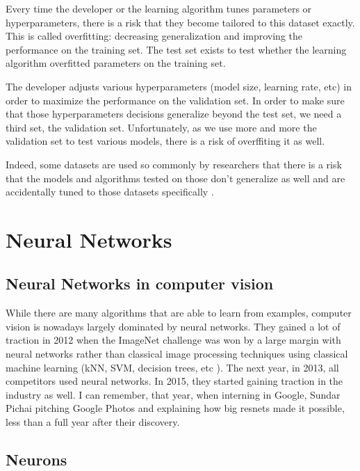Every time the developer or the learning algorithm tunes parameters or hyperparameters, there is a risk that they become tailored to this dataset exactly. This is called overfitting: decreasing generalization and improving the performance on the training set. The test set exists to test whether the learning algorithm overfitted parameters on the training set.

The developer adjusts various hyperparameters (model size, learning rate, etc) in order to maximize the performance on the validation set. In order to make sure that those hyperparameters decisions generalize beyond the test set, we need a third set, the validation set. Unfortunately, as we use more and more the validation set to test various models, there is a risk of overffiting it as well.

Indeed, some datasets are used so commonly by researchers that there is a risk that the models and algorithms tested on those don't generalize as well and are accidentally tuned to those datasets specifically \citep{imagenetgeneralizeimagenet}.


\section{Neural Networks}

\subsection{Neural Networks in computer vision}

While there are many algorithms that are able to learn from examples, computer vision is nowadays largely dominated by neural networks. They gained a lot of traction in 2012 when the ImageNet challenge \citep{imagenet} was won by a large margin with neural networks \citep{alexnet} rather than classical image processing techniques using classical machine learning (kNN, SVM, decision trees, etc \citep{bishop}). The next year, in 2013, all competitors used neural networks. In 2015, they started gaining traction in the industry as well. I can remember, that year, when interning in Google, Sundar Pichai pitching Google Photos and explaining how big resnets \citep{resnet} made it possible, less than a full year after their discovery.

\subsection{Neurons}

